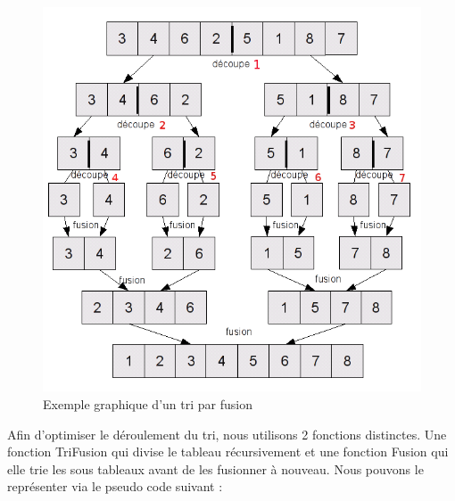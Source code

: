 \begin{figure}[H]
    \centering
        \includegraphics[scale=0.7]{ressources/fusion.png}
        \caption{Exemple graphique d’un tri par fusion}
    \label{fig:fusion}
\end{figure}
\par
Afin d’optimiser le déroulement du tri, nous utilisons 2 fonctions distinctes. Une fonction TriFusion qui divise le tableau récursivement et une fonction Fusion qui elle trie les sous tableaux
avant de les fusionner à nouveau. Nous pouvons le représenter via le pseudo code suivant :
\par
